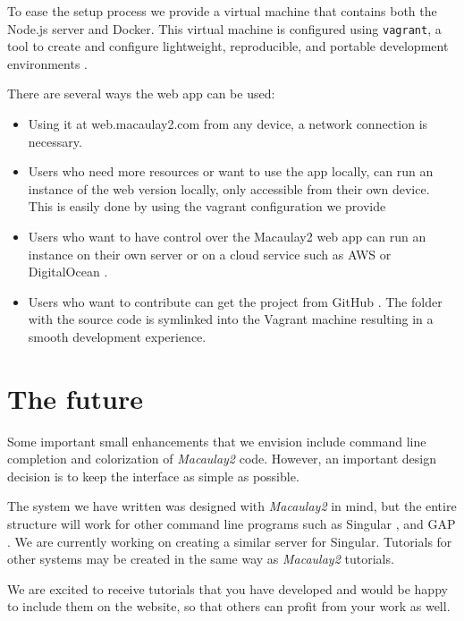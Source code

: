 \documentclass[twocolumn]{article}
\def\M2{{\it Macaulay2}}
\begin{document}
To ease the setup process we provide a virtual machine that contains both the Node.js server
and Docker. This virtual machine is configured using {\tt vagrant}, a tool to create and
configure lightweight, reproducible, and portable development environments \cite{vagrant}.

There are several ways the web app can be used:
\begin{itemize}
    \item Using it at web.macaulay2.com from any device, a network connection is necessary.
    \item Users who need more resources or want to use the app locally, can
    run an instance of the web version locally, only accessible from their own device.
    This is easily done by using the vagrant configuration we provide
    \item Users who want to have control over the Macaulay2 web app can run an
     instance on their own server or on a cloud
    service such as AWS or DigitalOcean \cite{AWS,digitalocean}.
     \item Users who want to contribute can get the project from GitHub \cite{github}.
     The folder
     with the source code is symlinked into the Vagrant machine resulting
     in a smooth development experience.
\end{itemize}


\section{The future}

Some important small enhancements that we envision include command
line completion and colorization of \M2 code.  However, an important
design decision is to keep the interface as simple as possible.

The system we have written was designed with \M2 in mind, but 
the entire structure will work for other command line programs such as Singular \cite{singular},
and GAP \cite{GAP4}.  We are currently working on creating a similar server for Singular.
Tutorials for other systems may be created in the same way as \M2 tutorials.

We are excited to receive tutorials that you have developed and would be happy
to include them on the website, so that others can profit from your work as
well.





\end{document}
